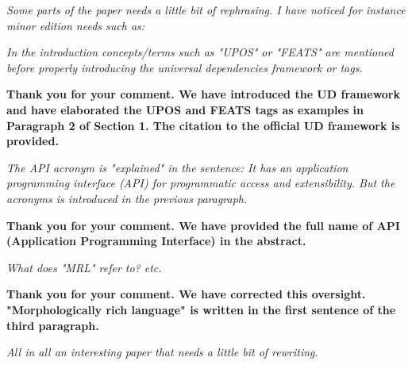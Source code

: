\documentclass[final,2p]{article}
\newcommand{\comment}{\emph}
\newcommand{\response}{\noindent \textbf}
\begin{document}
\comment{Some parts of the paper needs a little bit of rephrasing. I have noticed for instance minor edition needs such as:}

\comment{In the introduction concepts/terms such as "UPOS" or "FEATS" are mentioned before properly introducing the universal dependencies framework or tags.}

\response{Thank you for your comment. We have introduced the UD framework and have elaborated the UPOS and FEATS tags as examples in Paragraph 2 of Section 1. The citation to the official UD framework is provided.}

\comment{The API acronym is "explained" in the sentence: It has an application programming interface (API) for programmatic access and extensibility. But the acronyms is introduced in the previous paragraph.}

\response{Thank you for your comment. We have provided the full name of API (Application Programming Interface) in the abstract.}

\comment{What does "MRL" refer to? etc.}

\response{Thank you for your comment. We have corrected this oversight. "Morphologically rich language" is written in the first sentence of the third paragraph.}

\comment{All in all an interesting paper that needs a little bit of rewriting.}
\end{document}
